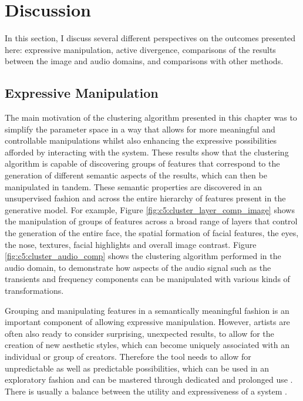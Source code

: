 \section{Discussion}

In this section, I discuss several different perspectives on the outcomes presented here: expressive manipulation, active divergence, comparisons of the results between the image and audio domains, and comparisons with other methods.

\subsection{Expressive Manipulation}

The main motivation of the clustering algorithm presented in this chapter was to simplify the parameter space in a way that allows for more meaningful and controllable manipulations whilst also enhancing the expressive possibilities afforded by interacting with the system. 
These results show that the clustering algorithm is capable of discovering groups of features that correspond to the generation of different semantic aspects of the results, which can then be manipulated in tandem. 
These semantic properties are discovered in an unsupervised fashion and across the entire hierarchy of features present in the generative model.
For example, Figure \ref{fig:c5:cluster_layer_comp_image} shows the manipulation of groups of features across a broad range of layers that control the generation of the entire face, the spatial formation of facial features, the eyes, the nose, textures, facial highlights and overall image contrast. Figure \ref{fig:c5:cluster_audio_comp} shows the clustering algorithm performed in the audio domain, to demonstrate how aspects of the audio signal such as the transients and frequency components can be manipulated with various kinds of transformations.

Grouping and manipulating features in a semantically meaningful fashion is an important component of allowing expressive manipulation. 
However, artists are often also ready to consider surprising, unexpected results, to allow for the creation of new aesthetic styles, which can become uniquely associated with an individual or group of creators. 
Therefore the tool needs to allow for unpredictable as well as predictable possibilities, which can be used in an exploratory fashion and can be mastered through dedicated and prolonged use \citep{dobrian2006nime}. 
There is usually a balance between the utility and expressiveness of a system \citep{jacobs2017supporting}. 

